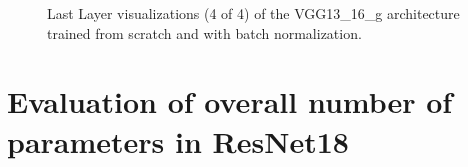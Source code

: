 \begin{figure}[!h]
\centering
\caption{Last Layer visualizations (4 of 4) of the VGG13\_16\_g architecture trained from scratch and with batch normalization.}
\label{fig:vgg13_g_filter_activation}
\end{figure}











\section{Evaluation of overall number of parameters in ResNet18}

